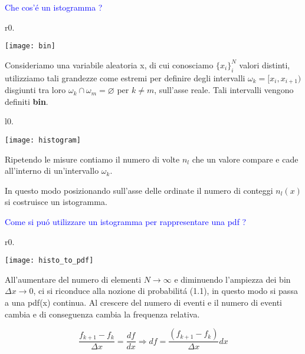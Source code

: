 \textcolor{blue}{Che cos'\'{e} un istogramma ?}\newline


\begin{wrapfigure}{r}{0.\textwidth}
\centering

\texttt{[image: bin]}	

\end{wrapfigure}

Consideriamo una variabile aleatoria x, di cui conosciamo $\{x_i\}_i^N$ valori distinti, utilizziamo tali grandezze come estremi per definire degli intervalli $\omega_{k} = [x_i, x_{i+1}) $ disgiunti tra loro $\omega_{k} \cap \omega_{m} = \varnothing$ per $k \neq m$, sull'asse reale. Tali intervalli vengono definiti \textbf{bin}.

\begin{wrapfigure}[3]{l}{0.\textwidth}

\centering

\texttt{[image: histogram]}	

\end{wrapfigure}

Ripetendo le misure contiamo il numero di volte $n_l$ che un valore compare e cade all'interno di un'intervallo $\omega_k$. 

In questo modo posizionando sull'asse delle ordinate il numero di conteggi $n_l(x)$ si costruisce un istogramma. \newline

\textcolor{blue}{Come si pu\'{o} utilizzare un istogramma per rappresentare una pdf ?}\newline


\begin{wrapfigure}{r}{0.\textwidth}

\centering

\texttt{[image: histo\_to\_pdf]}	

\end{wrapfigure}

All'aumentare del numero di elementi $N \rightarrow \infty$ e diminuendo l'ampiezza dei bin $\Delta x \rightarrow 0 $, ci si riconduce alla nozione di probabilit\'{a} (1.1), in questo modo si passa a una pdf(x) continua.
Al crescere del numero di eventi e il numero di eventi cambia  e di conseguenza cambia la frequenza relativa.

\begin{equation}
	\dfrac{f_{k+1} - f_{k}}{\Delta x} = \dfrac{df}{dx} \Rightarrow df = \dfrac{(f_{k+1} - f_{k})}{\Delta x}dx
\end{equation}

